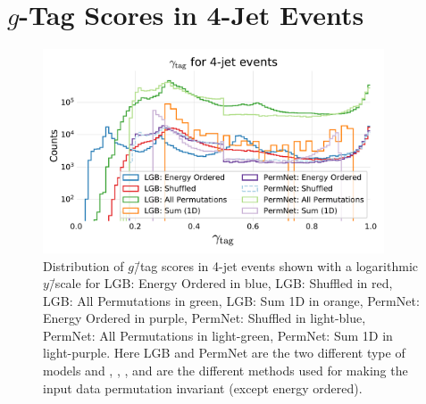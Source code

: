 \FloatBarrier
\section[g-Tag Scores in 4-Jet Events]{$g$-Tag Scores in 4-Jet Events}
\begin{figure}[h!]
  \centerfloat
    \includegraphics[width=0.9\textwidth, trim=10 10 10 45, clip]{figures/quarks/gtag_y_pred_4_jet_hist-down_sample=1.00-ML_vars=vertex-selection=b-ejet_min=4-n_iter_RS_lgb=99-n_iter_RS_xgb=9-cdot_cut=0.90-version=19.pdf}
    \vspace{-0.5cm}
    \caption[$g$\=/Tag Scores in 4-Jet Events]
          {Distribution of $g$\=/tag scores in 4-jet events shown with a logarithmic $y$\=/scale for LGB: Energy Ordered in blue, LGB: Shuffled in red, LGB: All Permutations in green, LGB: Sum 1D in orange, PermNet: Energy Ordered in purple, PermNet: Shuffled in light-blue, PermNet: All Permutations in light-green, PermNet: Sum 1D in light-purple.  Here LGB and PermNet are the two different type of models and , , , and  are the different methods used for making the input data permutation invariant (except energy ordered).}   
  \end{figure}
\vspace{4.5cm}
